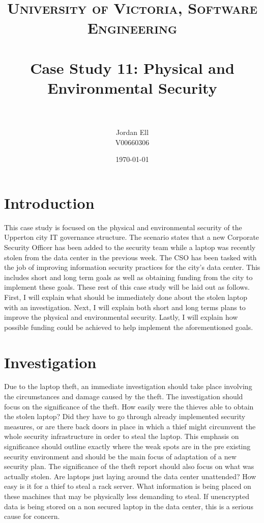 \documentclass[paper=a4, fontsize=11pt]{scrartcl} %
\title{	
\normalfont \normalsize 
\textsc{University of Victoria, Software Engineering} \\ [25pt] %
\horrule{0.5pt} \\[0.4cm] %
\huge Case Study 11: Physical and Environmental Security \\ %
\horrule{2pt} \\[0.5cm] %
}
\author{Jordan Ell \\ V00660306} %
\date{\normalsize\today} %
\numberwithin{equation}{section} %
\numberwithin{figure}{section} %
\numberwithin{table}{section} %
\begin{document}
\maketitle %


\section{Introduction}

This case study is focused on the physical and environmental security of the Upperton city
IT governance structure. The scenario states that a new Corporate Security Officer has been
added to the security team while a laptop was recently stolen from the data center in the 
previous week. The CSO has been tasked with the job of improving information security practices
for the city's data center. This includes short and long term goals as well as obtaining funding
from the city to implement these goals. These rest of this case study will be laid out as follows.
First, I will explain what should be immediately done about the stolen laptop with an investigation.
Next, I will explain both short and long terms plans to improve the physical and environmental
security. Lastly, I will explain how possible funding could be achieved to help implement the
aforementioned goals.


\section{Investigation}

Due to the laptop theft, an immediate investigation should take place involving the circumstances
and damage caused by the theft. The investigation should focus on the significance of the theft.
How easily were the thieves able to obtain the stolen laptop? Did they have to go through 
already implemented security measures, or are there back doors in place in which a thief might
circumvent the whole security infrastructure in order to steal the laptop. This emphasis on significance
should outline exactly where the weak spots are in the pre existing security environment and should
be the main focus of adaptation of a new security plan. The significance of the theft report should
also focus on what was actually stolen. Are laptops just laying around the data center unattended?
How easy is it for a thief to steal a rack server. What information is being placed on these machines
that may be physically less demanding to steal. If unencrypted data is being stored on a non secured
laptop in the data center, this is a serious cause for concern.\\
\end{document}
